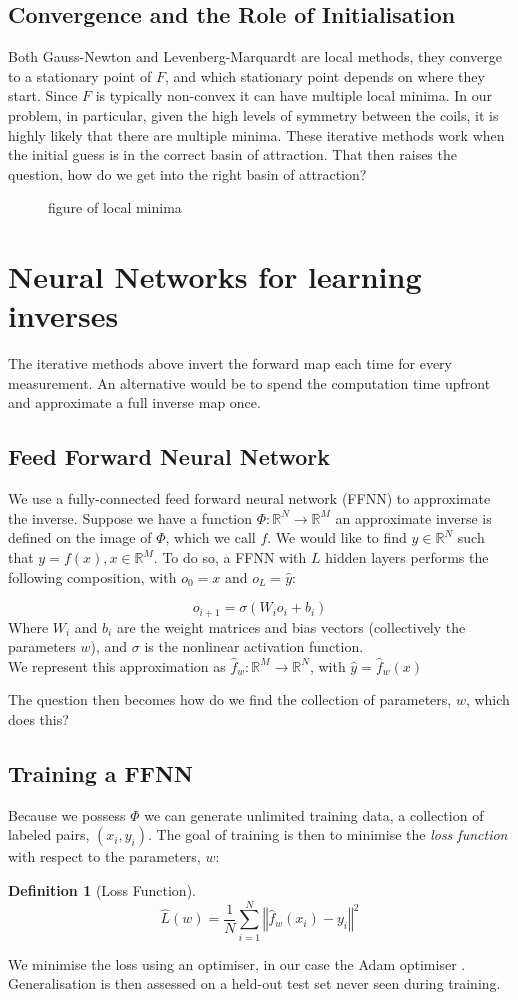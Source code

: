 \documentclass[12pt,a4paper]{report}
\newcommand{\missingfig}[1]{%
  \begin{figure}
    \centering
    \fbox{\parbox[c][3cm][c]{0.6\linewidth}{\centering
      \textbf{\color{red}[MISSING FIGURE]}\\[4pt] #1}}
    \caption{#1}
  \end{figure}%
}
\theoremstyle{definition}
\newtheorem{definition}{Definition}[section]
\begin{document}
\subsection{Convergence and the Role of Initialisation}
Both Gauss-Newton and Levenberg-Marquardt are local methods, they converge to a stationary point of $F$, and which stationary point depends on where they start. Since $F$ is typically non-convex it can have multiple local minima. In our problem, in particular, given the high levels of symmetry between the coils, it is highly likely that there are multiple minima. These iterative methods work when the initial guess is in the correct basin of attraction. That then raises the question, how do we get into the right basin of attraction?
\missingfig{figure of local minima}
\section{Neural Networks for learning inverses}
The iterative methods above invert the forward map each time for every measurement. An alternative would be to spend the computation time upfront and approximate a full inverse map once.

\subsection{Feed Forward Neural Network}
We use a fully-connected feed forward neural network (FFNN) to approximate the inverse. Suppose we have a function $\Phi: \mathbb{R}^N \rightarrow \mathbb{R}^M$ an approximate inverse is defined on the image of $\Phi$, which we call $f$. We would like to find $y \in \mathbb{R}^N$ such that $y = f(x), x \in \mathbb{R}^M$. To do so, a FFNN with $L$ hidden layers performs the following composition, with $o_0 = x$ and $o_L = \hat{y}$:

\begin{equation}
  \label{eq:FFNN}
  o_{i+1} = \sigma \left(W_io_i + b_i\right)
\end{equation}
Where $W_i$ and $b_i$ are the weight matrices and bias vectors (collectively the parameters $w$), and $\sigma$ is the nonlinear activation function.
\\
We represent this approximation as $\hat{f}_w: \mathbb{R}^M \rightarrow \mathbb{R}^N$, with $\hat{y} = \hat{f}_w(x)$ 

The question then becomes how do we find the collection of parameters, $w$, which does this?

\subsection{Training a FFNN}
Because we possess $\Phi$ we can generate unlimited training data, a collection of labeled pairs, $(x_i,y_i)$. The goal of training is then to minimise the \emph{loss function} with respect to the parameters, $w$:
\begin{definition}[Loss Function]
  \label{def:loss}
  $$\hat{L}(w) = \frac{1}{N} \sum_{i = 1}^N \left \Vert \hat{f}_w(x_i) - y_i \right \Vert ^2$$
\end{definition}
We minimise the loss using an optimiser, in our case the Adam optimiser \cite{kingma2015}. Generalisation is then assessed on a held-out test set never seen during training.
\end{document}
